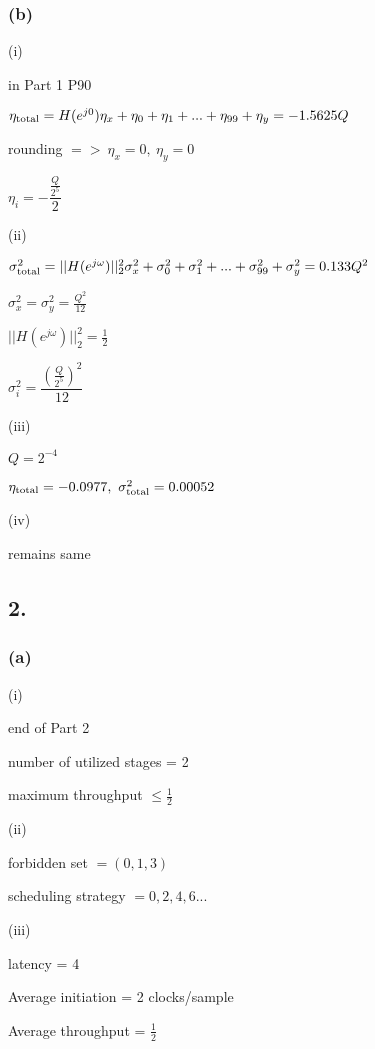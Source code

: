 \documentclass{article}
\begin{document}
\subsubsection*{(b)}
(i)\par
in Part 1 P90\par
$\eta_{\rm total}=H(e^{j0})\eta_{x}+\eta_{0}+\eta_{1}+...+\eta_{99}+\eta_{y}=-1.5625Q$\par
rounding $=> \ \eta_{x}=0, \ \eta_{y}=0$\par
$\eta_{i}=-\dfrac{\frac{Q}{2^5}}{2}$\par\indent
\par
(ii)\par
$\sigma_{\rm total}^{2}=||H(e^{j\omega})||_{2}^{2}\sigma_{x}^{2}+\sigma_{0}^{2}+\sigma_{1}^{2}+...+\sigma_{99}^{2}+\sigma_{y}^{2}=0.133Q^2$\par
$\sigma_{x}^{2}=\sigma_{y}^{2}=\frac{Q^2}{12}$\par
$||H(e^{j\omega})||_{2}^{2}=\frac{1}{2}$\par
$\sigma_{i}^{2}=\dfrac{(\frac{Q}{2^5})^{2}}{12}$\par\indent
\par
(iii)\par
$Q=2^{-4}$\par
$\eta_{\rm total}=-0.0977, \ \sigma_{\rm total}^{2}=0.00052$\par\indent
\par
(iv)\par
remains same

\subsection*{2.}
\subsubsection*{(a)}
(i)\par
end of Part 2\par
number of utilized stages = 2\par
maximum throughput $\leq \frac{1}{2}$\par\indent
\par
(ii)\par
forbidden set $= (0, 1, 3)$\par
scheduling strategy $=0,2,4,6...$\par\indent
\par
(iii)\par
latency = 4\par
Average initiation = 2 clocks/sample\par
Average throughput = $\frac{1}{2}$
\end{document}
